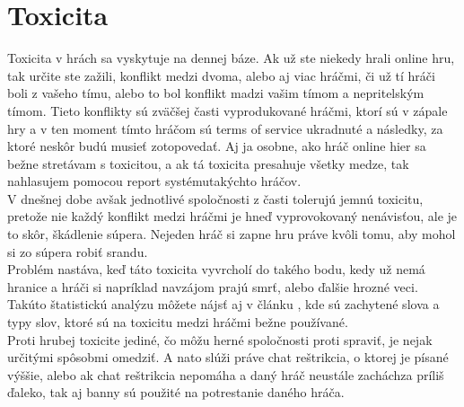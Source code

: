 \documentclass[twoside,twocolumn]{article}
\begin{document}

\section{Toxicita}

Toxicita v hrách sa vyskytuje na dennej báze. Ak už ste niekedy hrali online hru, tak určite ste zažili, konflikt medzi dvoma, alebo aj viac hráčmi, či už tí hráči boli z vašeho tímu, alebo to bol konflikt madzi vašim tímom a nepritelským tímom. Tieto konflikty sú zväčšej časti vyprodukované hráčmi, ktorí sú v zápale hry a v ten moment tímto hráčom sú terms of service ukradnuté a následky, za ktoré neskôr budú musieť zotopovedať. Aj ja osobne, ako hráč online hier sa bežne stretávam s toxicitou, a ak tá toxicita presahuje všetky medze, tak nahlasujem pomocou report systému\footnotemark[1] takýchto hráčov.\\
V dnešnej dobe avšak jednotlivé spoločnosti z časti tolerujú jemnú toxicitu, pretože nie každý konflikt medzi hráčmi je hneď vyprovokovaný nenávisťou, ale je to skôr, škádlenie súpera. Nejeden hráč si zapne hru práve kvôli tomu, aby mohol si zo súpera robiť srandu.\\
Problém nastáva, keď táto toxicita vyvrcholí do takého bodu, kedy už nemá hranice a hráči si napríklad navzájom prajú smrť, alebo ďalšie hrozné veci. Takúto štatistickú analýzu môžete nájsť aj v článku \cite{ghosh2021analyzing}, kde sú zachytené slova a typy slov, ktoré sú na toxicitu medzi hráčmi bežne používané.\\ 
Proti hrubej toxicite jediné, čo môžu herné spoločnosti proti spraviť, je nejak určitými spôsobmi omedziť. A nato slúži práve chat reštrikcia, o ktorej je písané výššie, alebo ak chat reštrikcia nepomáha a daný hráč neustále zacháchza príliš ďaleko, tak aj banny sú použité na potrestanie daného hráča.\\




\end{document}
